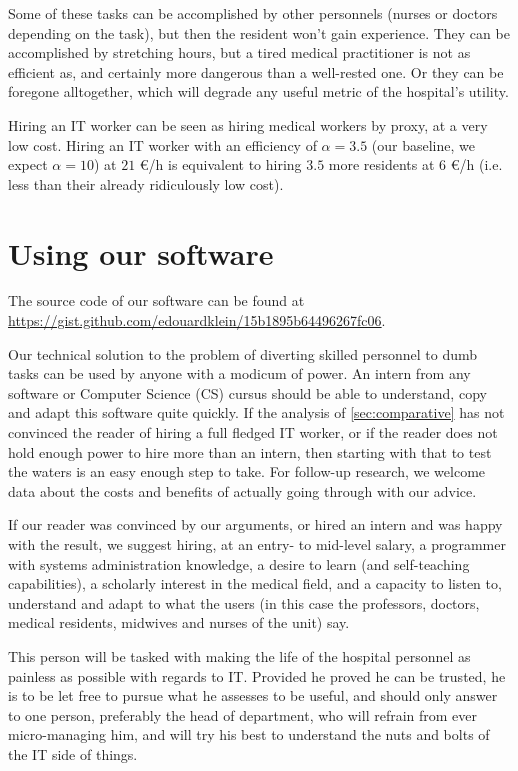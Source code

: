 \documentclass[nobib]{tufte-handout}
\begin{document}
Some of these tasks can be accomplished by other personnels (nurses or doctors depending on the task), but then the resident won't gain experience. They can be accomplished by stretching hours, but a tired medical practitioner is not as efficient as, and certainly more dangerous than a well-rested one. Or they can be foregone alltogether, which will degrade any useful metric of the hospital's utility.

Hiring an IT worker can be seen as hiring medical workers by proxy, at a very low cost. Hiring an IT worker with an efficiency of $\alpha = 3.5$ (our baseline, we expect $\alpha=10$) at $21$ €/h is equivalent to hiring $3.5$ more residents at $6$ €/h (i.e. less than their already ridiculously low cost).








\section{Using our software}
\label{sec:deployment}

The source code of our software can be found at \url{https://gist.github.com/edouardklein/15b1895b64496267fc06}.

Our technical solution to the problem of diverting skilled personnel to dumb tasks can be used by anyone with a modicum of power.  An intern from any software or Computer Science (CS) cursus should be able to understand, copy and adapt this software quite quickly. If the analysis of \autoref{sec:comparative} has not convinced the reader of hiring a full fledged IT worker, or if the reader does not hold enough power to hire more than an intern, then starting with that to test the waters is an easy enough step to take. For follow-up research, we welcome data about the costs and benefits of actually going through with our advice.

If our reader was convinced by our arguments, or hired an intern and was happy with the result, we suggest  hiring, at an entry- to mid-level salary, a programmer with systems administration knowledge, a desire to learn (and self-teaching capabilities), a scholarly interest in the medical field, and a capacity to listen to, understand and adapt to what the users (in this case the professors, doctors, medical residents, midwives and nurses of the unit) say.

This person will be tasked with making the life of the hospital personnel as painless as possible with regards to IT. Provided he proved he can be trusted, he is to be let free to pursue what he assesses to be useful, and should only answer to one person, preferably the head of department, who will  refrain from ever micro-managing him, and will try his best to understand the nuts and bolts of the IT side of things.
\end{document}
